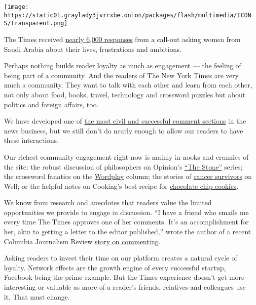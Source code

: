 \texttt{[image: https://static01.graylady3jvrrxbe.onion/packages/flash/multimedia/ICONS/transparent.png]}

The Times received
\href{https://mobile.nytimes3xbfgragh.onion/2016/10/29/world/middleeast/saudi-arabia-women.html?referer=}{nearly
6,000 responses} from a call-out asking women from Saudi Arabia about
their lives, frustrations and ambitions.

Perhaps nothing builds reader loyalty as much as engagement --- the
feeling of being part of a community. And the readers of The New York
Times are very much a community. They want to talk with each other and
learn from each other, not only about food, books, travel, technology
and crossword puzzles but about politics and foreign affairs, too.

We have developed one of
\href{https://www.nytimes3xbfgragh.onion/times-insider/2014/04/17/a-comments-path-to-publication/}{the
most civil and successful comment sections} in the news business, but we
still don't do nearly enough to allow our readers to have these
interactions.

Our richest community engagement right now is mainly in nooks and
crannies of the site: the robust discussion of philosophers on Opinion's
\href{https://www.nytimes3xbfgragh.onion/2017/01/09/opinion/is-humanism-really-humane.html}{``The
Stone''} series; the crossword fanatics on the
\href{https://www.nytimes3xbfgragh.onion/column/wordplay}{Wordplay}
column; the stories of
\href{http://well.blogs.nytimes3xbfgragh.onion/projects/breast-cancer-stories}{cancer
survivors} on Well; or the helpful notes on Cooking's best recipe for
\href{https://cooking.nytimes3xbfgragh.onion/recipes/1015819-chocolate-chip-cookies}{chocolate
chip cookies}.

We know from research and anecdotes that readers value the limited
opportunities we provide to engage in discussion. ``I have a friend who
emails me every time The Times approves one of her comments. It's an
accomplishment for her, akin to getting a letter to the editor
published,'' wrote the author of a recent Columbia Journalism Review
\href{http://www.cjr.org/first_person/comments_articles_publishers.php}{story
on commenting}.

Asking readers to invest their time on our platform creates a natural
cycle of loyalty. Network effects are the growth engine of every
successful startup, Facebook being the prime example. But the Times
experience doesn't get more interesting or valuable as more of a
reader's friends, relatives and colleagues use it. That must change.

